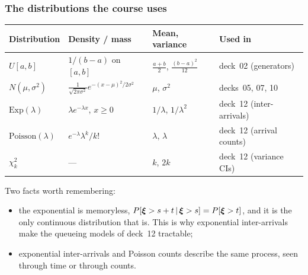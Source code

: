 \documentclass[aspectratio=169]{beamer}
\begin{document}

\begin{frame}
\frametitle{The distributions the course uses}

\begin{center}
{\footnotesize
\begin{tabular}{|l|l|l|l|}
\hline
Distribution & Density / mass & Mean, variance & Used in \\
\hline
\hline
$U[a,b]$ & $1/(b-a)$ on $[a,b]$ & $\frac{a+b}{2}$, $\frac{(b-a)^2}{12}$ & deck~02 (generators) \\
$N(\mu, \sigma^2)$ & $\frac{1}{\sqrt{2\pi\sigma^2}}e^{-(x-\mu)^2/2\sigma^2}$ & $\mu$, $\sigma^2$ & decks~05, 07, 10 \\
$\text{Exp}(\lambda)$ & $\lambda e^{-\lambda x}$, $x \geq 0$ & $1/\lambda$, $1/\lambda^2$ & deck~12 (inter-arrivals) \\
$\text{Poisson}(\lambda)$ & $e^{-\lambda}\lambda^k/k!$ & $\lambda$, $\lambda$ & deck~12 (arrival counts) \\
$\chi^2_{k}$ & --- & $k$, $2k$ & deck~12 (variance CIs) \\
\hline
\end{tabular}}
\end{center}

\mbox{}

Two facts worth remembering:
\begin{itemize}
\item
the exponential is {\red memoryless}, $P[{\boldsymbol{\xi}} > s+t \,|\, {\boldsymbol{\xi}} > s] = P[{\boldsymbol{\xi}} > t]$, and it is the only continuous distribution that is. This is why exponential inter-arrivals make the queueing models of deck~12 tractable;
\item
exponential inter-arrivals and Poisson counts describe the {\red same} process, seen through time or through counts.
\end{itemize}

\end{frame}
\end{document}
